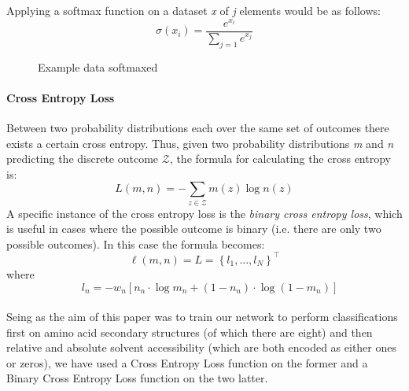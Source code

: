 Applying a softmax function on a dataset \textit{x} of \textit{j} elements would be as follows:
$$
\sigma(x_i) = \frac{e^{x_i}}{\sum_{j=1} e^{x_j}}
$$

\begin{figure}[h]
  \centering
  \caption{Example data softmaxed}
\end{figure}


\paragraph{Cross Entropy Loss}
Between two probability distributions each over the same set of outcomes there exists a certain cross entropy.
Thus, given two probability distributions \textit{m} and \textit{n} predicting the discrete outcome $\mathcal{Z}$, the formula for calculating the cross entropy is:
$$L ( m , n ) = - \sum _ { z \in \mathcal { Z } } m ( z ) \log n ( z )$$
A specific instance of the cross entropy loss is the \textit{binary cross entropy loss}, which is useful in cases where the possible outcome is binary (i.e. there are only two possible outcomes). In this case the formula becomes:\\
\[
\ell(m, n)=L=\left\{l_{1}, \ldots, l_{N}\right\}^{\top}
\]
where
\[ \quad l_{n}=-w_{n}\left[n_{n} \cdot \log m_{n}+\left(1-n_{n}\right) \cdot \log \left(1-m_{n}\right)\right]
\]
\\
Seing as the aim of this paper was to train our network to perform classifications first on amino acid secondary structures (of which there are eight) and then relative and absolute solvent accessibility (which are both encoded as either ones or zeros), we have used a Cross Entropy Loss function on the former and a Binary Cross Entropy Loss function on the two latter.


